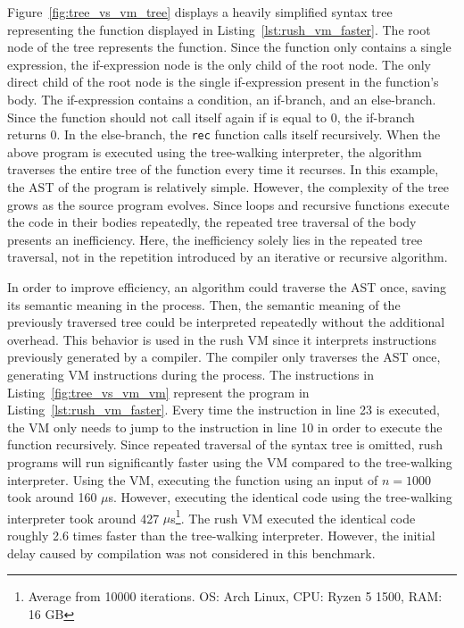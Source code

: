 Figure~\ref{fig:tree_vs_vm_tree} displays a heavily simplified syntax tree representing the function displayed in Listing~\ref{lst:rush_vm_faster}.
The root node of the tree represents the  function.
Since the function only contains a single expression, the if-expression node is the only child of the root node.
The only direct child of the root node is the single if-expression present in the function's body.
The if-expression contains a condition, an if-branch, and an else-branch.
Since the function should not call itself again if  is equal to 0, the if-branch returns 0.
In the else-branch, the \texttt{rec} function calls itself recursively.
When the above program is executed using the tree-walking interpreter, the algorithm traverses the entire tree of the  function every time it recurses.
In this example, the AST of the program is relatively simple.
However, the complexity of the tree grows as the source program evolves.
Since loops and recursive functions execute the code in their bodies repeatedly, the repeated tree traversal of the body presents an inefficiency.
Here, the inefficiency solely lies in the repeated tree traversal, not in the repetition introduced by an iterative or recursive algorithm.

In order to improve efficiency, an algorithm could traverse the AST once, saving its semantic meaning in the process.
Then, the semantic meaning of the previously traversed tree could be interpreted repeatedly without the additional overhead.
This behavior is used in the rush VM since it interprets instructions previously generated by a compiler.
The compiler only traverses the AST once, generating VM instructions during the process.
The instructions in Listing~\ref{fig:tree_vs_vm_vm} represent the program in Listing~\ref{lst:rush_vm_faster}.
Every time the  instruction in line 23 is executed, the VM only needs to jump to the instruction in line 10 in order to execute the  function recursively.
Since repeated traversal of the syntax tree is omitted, rush programs will run significantly faster using the VM compared to the tree-walking interpreter.
Using the VM, executing the  function using an input of $n = 1000$ took around 160 $\mu$s.
However, executing the identical code using the tree-walking interpreter took around 427 $\mu$s\footnote{Average from 10000 iterations. OS: Arch Linux, CPU: Ryzen 5 1500, RAM: 16 GB}.
The rush VM executed the identical code roughly 2.6 times faster than the tree-walking interpreter.
However, the initial delay caused by compilation was not considered in this benchmark.

